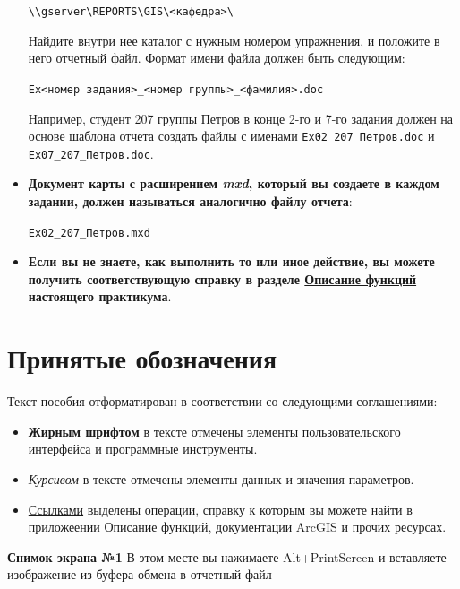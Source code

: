 \documentclass[12pt,]{book}
\providecommand{\tightlist}{%
  \setlength{\itemsep}{0pt}\setlength{\parskip}{0pt}}
\begin{document}
\begin{itemize}
  \texttt{\textbackslash{}\textbackslash{}gserver\textbackslash{}REPORTS\textbackslash{}GIS\textbackslash{}\textless{}кафедра\textgreater{}\textbackslash{}}

  Найдите внутри нее каталог с нужным номером упражнения, и положите в него отчетный файл. Формат имени файла должен быть следующим:

  \texttt{Ex\textless{}номер\ задания\textgreater{}\_\textless{}номер\ группы\textgreater{}\_\textless{}фамилия\textgreater{}.doc}

  Например, студент 207 группы Петров в конце 2-го и 7-го задания должен на основе шаблона отчета создать файлы с именами \texttt{Ex02\_207\_Петров.doc} и \texttt{Ex07\_207\_Петров.doc}.
\item
  \textbf{Документ карты с расширением \emph{mxd}, который вы создаете в каждом задании, должен называться аналогично файлу отчета}:

  \texttt{Ex02\_207\_Петров.mxd}
\item
  \textbf{Если вы не знаете, как выполнить то или иное действие, вы можете получить соответствующую справку в разделе \protect\hyperlink{manual-catalog}{Описание функций} настоящего практикума}.
\end{itemize}

\hypertarget{section-2}{%
\section*{Принятые обозначения}\label{section-2}}

Текст пособия отформатирован в соответствии со следующими соглашениями:

\begin{itemize}
\tightlist
\item
  \textbf{Жирным шрифтом} в тексте отмечены элементы пользовательского интерфейса и программные инструменты.
\item
  \emph{Курсивом} в тексте отмечены элементы данных и значения параметров.
\item
  \href{}{Ссылками} выделены операции, справку к которым вы можете найти в приложеении \protect\hyperlink{manual-catalog}{Описание функций}, \href{https://desktop.arcgis.com/ru/documentation/}{документации ArcGIS} и прочих ресурсах.
\end{itemize}

\textbf{Снимок экрана №1} В этом месте вы нажимаете Alt+PrintScreen и вставляете изображение из буфера обмена в отчетный файл
\end{document}
